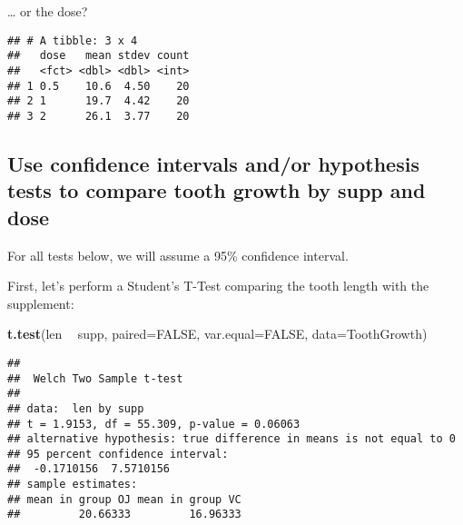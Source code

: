 \documentclass[]{article}
\newenvironment{Shaded}{\begin{snugshade}}{\end{snugshade}}
\newcommand{\DataTypeTok}[1]{\textcolor[rgb]{0.13,0.29,0.53}{#1}}
\newcommand{\DecValTok}[1]{\textcolor[rgb]{0.00,0.00,0.81}{#1}}
\newcommand{\KeywordTok}[1]{\textcolor[rgb]{0.13,0.29,0.53}{\textbf{#1}}}
\newcommand{\NormalTok}[1]{#1}
\newcommand{\OperatorTok}[1]{\textcolor[rgb]{0.81,0.36,0.00}{\textbf{#1}}}
\newcommand{\OtherTok}[1]{\textcolor[rgb]{0.56,0.35,0.01}{#1}}
\newcommand{\StringTok}[1]{\textcolor[rgb]{0.31,0.60,0.02}{#1}}
\begin{document}
\ldots{} or the dose?

\begin{Shaded}
\end{Shaded}

\begin{verbatim}
## # A tibble: 3 x 4
##   dose   mean stdev count
##   <fct> <dbl> <dbl> <int>
## 1 0.5    10.6  4.50    20
## 2 1      19.7  4.42    20
## 3 2      26.1  3.77    20
\end{verbatim}

\hypertarget{use-confidence-intervals-andor-hypothesis-tests-to-compare-tooth-growth-by-supp-and-dose}{%
\subsection{Use confidence intervals and/or hypothesis tests to compare
tooth growth by supp and
dose}\label{use-confidence-intervals-andor-hypothesis-tests-to-compare-tooth-growth-by-supp-and-dose}}

For all tests below, we will assume a 95\% confidence interval.

First, let's perform a Student's T-Test comparing the tooth length with
the supplement:

\begin{Shaded}
\begin{Highlighting}[]
\KeywordTok{t.test}\NormalTok{(len }\OperatorTok{~}\StringTok{ }\NormalTok{supp, }\DataTypeTok{paired=}\OtherTok{FALSE}\NormalTok{, }\DataTypeTok{var.equal=}\OtherTok{FALSE}\NormalTok{, }\DataTypeTok{data=}\NormalTok{ToothGrowth)}
\end{Highlighting}
\end{Shaded}

\begin{verbatim}
## 
##  Welch Two Sample t-test
## 
## data:  len by supp
## t = 1.9153, df = 55.309, p-value = 0.06063
## alternative hypothesis: true difference in means is not equal to 0
## 95 percent confidence interval:
##  -0.1710156  7.5710156
## sample estimates:
## mean in group OJ mean in group VC 
##         20.66333         16.96333
\end{verbatim}
\end{document}
